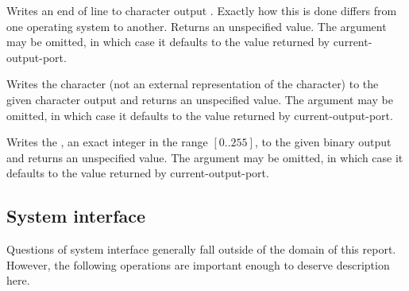 \begin{entry}{%
}

Writes an end of line to character output .  Exactly how this
is done differs
from one operating system to another.  Returns an unspecified value.
The  argument may be omitted, in which case it defaults to the
value returned by {\cf current-output-port}.

\end{entry}


\begin{entry}{%
}

Writes the character  (not an external representation of the
character) to the given character output  and returns an unspecified
value.  The
 argument may be omitted, in which case it defaults to the value
returned by {\cf current-output-port}.

\end{entry}

\begin{entry}{%
}

Writes the , an exact integer in the range $[0..255]$, to
the given binary output  and returns an unspecified value.
The  argument may be omitted, in which case it defaults to
the value returned by {\cf current-output-port}.

\end{entry}


\subsection{System interface}

Questions of system interface generally fall outside of the domain of this
report.  However, the following operations are important enough to
deserve description here.


